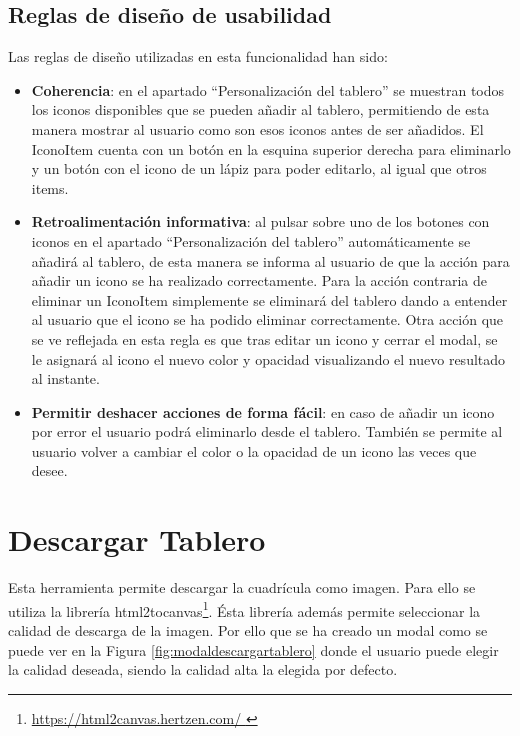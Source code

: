 \subsection{Reglas de diseño de usabilidad}
 Las reglas de diseño utilizadas en esta funcionalidad han sido:
\begin{itemize}
	\item \textbf{Coherencia}: en el apartado “Personalización del tablero” se muestran todos los iconos disponibles que se pueden añadir al tablero, permitiendo de esta manera mostrar al usuario como son esos iconos antes de ser añadidos. El IconoItem cuenta con un botón en la esquina superior derecha para eliminarlo y un botón con el icono de un lápiz para poder editarlo, al igual que otros items.
	
	
	\item \textbf{Retroalimentación informativa}: al pulsar sobre uno de los botones con iconos en el apartado “Personalización del tablero” automáticamente se añadirá al tablero, de esta manera se informa al usuario de que la acción para añadir un icono se ha realizado correctamente. Para la acción contraria de eliminar un IconoItem simplemente se eliminará del tablero dando a entender al usuario que el icono se ha podido eliminar correctamente. Otra acción que se ve reflejada en esta regla es que tras editar un icono y cerrar el modal, se le asignará al icono el nuevo color y opacidad visualizando el nuevo resultado al instante.
	
	
	\item \textbf{Permitir deshacer acciones de forma fácil}: en caso de añadir un icono por error el usuario podrá eliminarlo desde el tablero. También se permite al usuario volver a cambiar el color o la opacidad de un icono las veces que desee.
	
\end{itemize}


\section{Descargar Tablero}


Esta herramienta permite descargar la cuadrícula como imagen. Para ello se utiliza la librería html2tocanvas\footnote{\url{https://html2canvas.hertzen.com/ }}. Ésta librería además permite seleccionar la calidad de descarga de la imagen. Por ello que se ha creado un modal como se puede ver en la Figura \ref{fig:modaldescargartablero} donde el usuario puede elegir la calidad deseada, siendo la calidad alta la elegida por defecto. 


